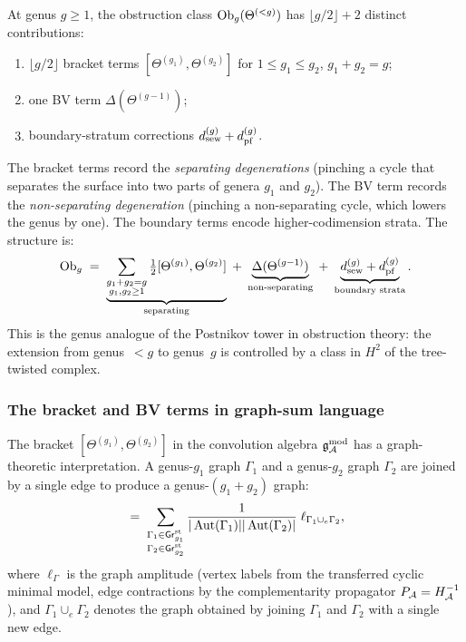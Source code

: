 \begin{remark}
At genus $g \geq 1$, the obstruction class
$\mathrm{Ob}_g(\Theta^{(<g)})$ has $\lfloor g/2 \rfloor + 2$ distinct
contributions:
\begin{enumerate}[label=(\alph*)]
\item $\lfloor g/2 \rfloor$ bracket terms
 $[\Theta^{(g_1)},\Theta^{(g_2)}]$ for $1 \leq g_1 \leq g_2$,
 $g_1 + g_2 = g$;
\item one BV term $\Delta(\Theta^{(g-1)})$;
\item boundary-stratum corrections $d_{\mathrm{sew}}^{(g)} + d_{\mathrm{pf}}^{(g)}$.
\end{enumerate}
The bracket terms record the \emph{separating degenerations}
(pinching a cycle that separates the surface into two parts of
genera $g_1$ and $g_2$). The BV term records the
\emph{non-separating degeneration} (pinching a non-separating
cycle, which lowers the genus by one). The boundary terms encode
higher-codimension strata. The structure is:
\begin{equation}%
\Ob_g
\;=\;
\underbrace{
\sum_{\substack{g_1+g_2=g \\ g_1,g_2 \geq 1}}
\tfrac{1}{2}[\Theta^{(g_1)},\Theta^{(g_2)}]
}_{\text{separating}}
\;+\;
\underbrace{
\Delta(\Theta^{(g-1)})
}_{\text{non-separating}}
\;+\;
\underbrace{
\dsew^{(g)} + \dpf^{(g)}
}_{\text{boundary strata}}.
\end{equation}
This is the genus analogue of the Postnikov tower in
obstruction theory: the extension from genus~$<g$ to genus~$g$
is controlled by a class in $H^2$ of the tree-twisted complex.
\end{remark}

\subsubsection{The bracket and BV terms in graph-sum language}

The bracket $[\Theta^{(g_1)},\Theta^{(g_2)}]$ in the
convolution algebra $\mathfrak{g}_{\mathcal{A}}^{\mathrm{mod}}$ has a graph-theoretic interpretation.
A genus-$g_1$ graph $\Gamma_1$ and a genus-$g_2$ graph $\Gamma_2$
are joined by a single edge to produce a genus-$(g_1{+}g_2)$
graph:
\begin{equation}%
[\Theta^{(g_1)},\Theta^{(g_2)}]
\;=\;
\sum_{\substack{\Gamma_1 \in \mathsf{Gr}_{g_1}^{\mathrm{st}}\\
 \Gamma_2 \in \mathsf{Gr}_{g_2}^{\mathrm{st}}}}
\frac{1}{|\Aut(\Gamma_1)||\Aut(\Gamma_2)|}
\;\ell_{\Gamma_1 \cup_e \Gamma_2},
\end{equation}
where $\ell_\Gamma$ is the graph amplitude
(vertex labels from the transferred cyclic minimal model, edge
contractions by the complementarity propagator
$P_{\mathcal{A}} = H_{\mathcal{A}}^{-1}$), and $\Gamma_1 \cup_e \Gamma_2$ denotes
the graph obtained by joining $\Gamma_1$ and $\Gamma_2$ with a
single new edge.

